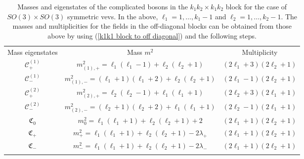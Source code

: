 \begin{table}
%
\begin{center}
%
\begingroup
\setlength{\tabcolsep}{8pt} %
\renewcommand{\arraystretch}{2.0} %
%
\begin{tabular}{ !{\vrule width 1.5pt}c!{\vrule width 1.5pt}c!{\vrule width 1.5pt}c!{\vrule width 1.5pt} }
 	Mass eigenstates & Mass $m^2$ & Multiplicity \\
 	$\mathcal{C}^{(1)}_+$ & $m^2_{(1),+} = \ell_1 (\ell_1 - 1) + \ell_2 (\ell_2 + 1)$ & $(2 \ell_1 + 3) (2 \ell_2 + 1)$ \\
 	\hline
 	$\mathcal{C}^{(1)}_-$ & $m^2_{(1),-} = (\ell_1 + 1) (\ell_1 + 2) + \ell_2 (\ell_2 + 1)$ & $(2 \ell_1 - 1) (2 \ell_2 + 1)$ \\
 	\hline
 	$\mathcal{C}^{(2)}_+$ & $m^2_{(2),+} = \ell_2 (\ell_2 - 1) + \ell_1 (\ell_1 + 1)$ & $(2 \ell_2 + 3) (2 \ell_1 + 1)$ \\
 	\hline
 	$\mathcal{C}^{(2)}_-$ & $m^2_{(2),-} = (\ell_2 + 1) (\ell_2 + 2) + \ell_1 (\ell_1 + 1)$ & $(2 \ell_2 - 1) (2 \ell_1 + 1)$ \\
 	\hline
 	$\mathfrak{C}_0$ & $m^2_0 = \ell_1 (\ell_1 + 1) + \ell_2 (\ell_2 + 1) + 2$ & $(2 \ell_1 + 1) (2 \ell_2 + 1)$ \\
 	\hline
 	$\mathfrak{C}_+$ & $m^2_+ = \ell_1 (\ell_1 + 1) + \ell_2 (\ell_2 + 1) - 2 \lambda_+$ & $(2 \ell_1 + 1) (2 \ell_2 + 1)$ \\
 	\hline
 	$\mathfrak{C}_-$ & $m^2_- = \ell_1 (\ell_1 + 1) + \ell_2 (\ell_2 + 1) - 2 \lambda_-$ & $(2 \ell_1 + 1) (2 \ell_2 + 1)$ \\
\end{tabular}
%
\endgroup
%
\end{center}
%
\caption[Masses and eigenstates for $SO(3) \times SO(3)$ comp. bosons]{Masses and eigenstates of the complicated bosons in the $k_1 k_2 \times k_1 k_2$ block for the case of $SO(3) \times SO(3)$ symmetric vevs. In the above, $\ell_1 = 1,\ldots, k_1 - 1$ and $\ell_2 = 1,\ldots, k_2 - 1$. The masses and multiplicities for the fields in the off-diagonal blocks can be obtained from those above by using (\ref{k1k1 block to off diagonal}) and the following steps.}
%
\label{tab:boson_masses_complicated}
%
\end{table}
%
%

